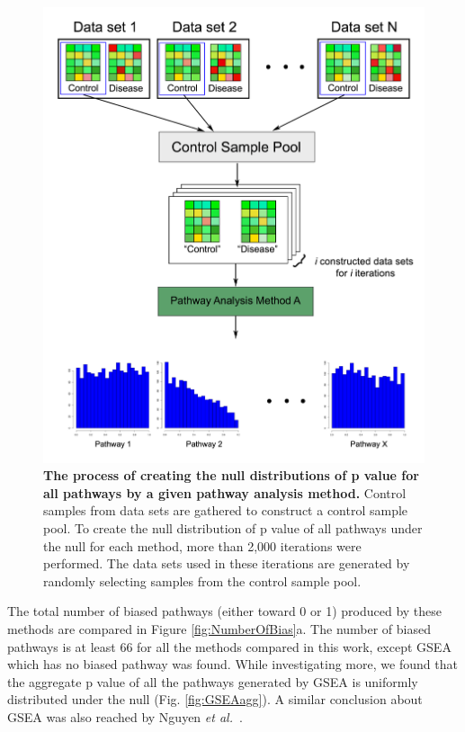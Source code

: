\begin{figure}
\centering
	\includegraphics[width=0.8\linewidth]{../Figures/Fig4}
  \caption{\textbf{The process of creating the null distributions of p value for all pathways by a given pathway analysis method.} Control samples from data sets are  gathered to construct a control sample pool. To create the null distribution of p value of all pathways under the null for each method, more than 2,000 iterations were performed. The data sets used in these iterations are generated by randomly selecting samples from the control sample pool.}
  \label{nullGeneration}
\end{figure}

The total number of biased pathways  (either toward 0 or 1) produced by these methods are compared in Figure \ref{fig:NumberOfBias}a.
The number of biased pathways is at least 66 for all the methods compared in this work, except GSEA which has no biased pathway was found. 
While investigating more, we found that the aggregate p value of all the pathways generated by GSEA is uniformly distributed under the null (Fig. \ref{fig:GSEAagg}).
A similar conclusion about GSEA was also reached by Nguyen \textit{et al.}~\cite{nguyen2017DANUBE}.

